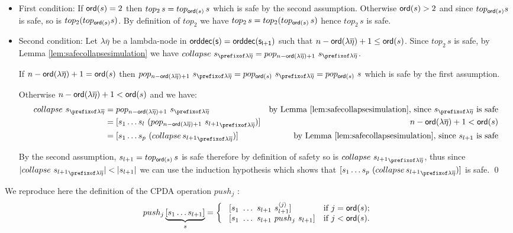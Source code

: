 \documentclass[a4paper]{article}
\theoremstyle{remark}
\theoremstyle{definition}
\newcommand\orddec{\sf orddec}
\begin{document}
\begin{itemize}
\item First condition: If ${\sf ord}(s)=2$ then $top_2\,s = top_{{\sf ord}(s)}\,s$ which is safe by the second assumption. Otherwise ${\sf ord}(s)>2$ and since $top_{{\sf ord}(s)} s$ is safe, so is $top_2(top_{{\sf ord}(s)} s)$. By definition of $top_2$ we have $top_2\,s = top_2(top_{{\sf ord}(s)}\, s)$ hence $top_2\,s$ is safe.

\item Second condition: Let $\lambda \overline{\eta}$ be a lambda-node in $\orddec(s) = \orddec(s_{l+1})$ such that $n-{\sf ord}(\lambda \overline{\eta})+1 \leq {\sf ord}(s)$.
Since $top_2\,s$ is safe, by Lemma \ref{lem:safecollapsesimulation} we have
$collapse~s_{\prefixof \lambda \overline{\eta}} = pop_{n-\ord{\lambda \overline{\eta}}+1}~s_{\prefixof \lambda \overline{\eta}}$.

If $n-{\sf ord}(\lambda \overline{\eta})+1 = {\sf ord}(s)$ then
$pop_{n-\ord{\lambda \overline{\eta}}+1}~s_{\prefixof \lambda \overline{\eta}} = pop_{\ord{s}}~s_{\prefixof\lambda\overline\eta} = pop_{\ord{s}}~s$ which is safe by the first assumption.

Otherwise $n-{\sf ord}(\lambda \overline{\eta})+1 < {\sf ord}(s)$ and we have:
\begin{align*}
  collapse~s_{\prefixof\lambda\overline\eta}
      &= pop_{n-\ord{\lambda \overline{\eta}}+1}~s_{\prefixof\lambda\overline\eta}
      & \mbox{by Lemma \ref{lem:safecollapsesimulation}, since $s_{\prefixof\lambda\overline\eta}$ is safe} \\
  &= [ s_1 \ldots s_l\ (pop_{n-\ord{\lambda\overline\eta}+1}~ {s_{l+1}}_{\prefixof\lambda\overline\eta}) ]
   & \mbox{$n-\ord{\lambda \overline{\eta}}+1<\ord{s}$}  \\
  &= [s_1 \ldots s_p\ (collapse\, {s_{l+1}}_{\prefixof\lambda\overline\eta}) ]
  & \mbox{by Lemma \ref{lem:safecollapsesimulation}, since $s_{l+1}$ is safe}
\end{align*}

By the second assumption, $s_{l+1} = top_{{\sf ord}(s)}\,s$ is safe therefore by definition
of safety so is $collapse~{s_{l+1}}_{\prefixof\lambda\overline\eta}$, thus
since $|collapse~{s_{l+1}}_{\prefixof\lambda\overline\eta}| < |s_{l+1}|$ we can use the induction hypothesis which shows that $[s_1 \ldots s_p\ (collapse\, {s_{l+1}}_{\prefixof\lambda\overline\eta}) ]$ is safe.
\qed
\end{itemize}


We reproduce here the definition of the CPDA operation $push_j$ \cite{hmos-lics08}:
$$ push_j \underbrace{[ s_1 \ldots s_{l+1} ]}_{s} =
\left\{
  \begin{array}{ll}
\    [s_1\ \ldots\ s_{l+1}\ s_{l+1}^{\langle j \rangle}]  &\hbox{if $j = {\sf ord}(s)$;}\\
\    [s_1\ \ldots\ s_{l+1}\ push_j\ s_{l+1}]  &\hbox{if $j<{\sf ord}(s)$.}
 \end{array}
\right.
$$
\end{document}

